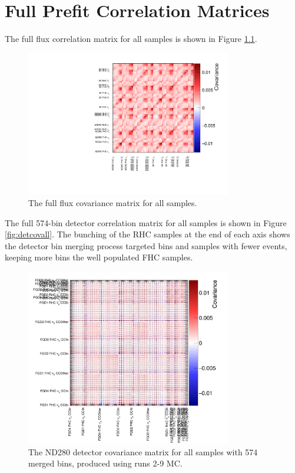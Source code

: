 \chapter{Full Prefit Correlation Matrices}\label{app:matrices}

The full flux correlation matrix for all samples is shown in Figure \ref{fig:fluxcov}.

\begin{figure}[!htbp]
\centering
\includegraphics*[width=0.8\textwidth,clip]{figs/fluxcov}
\caption{The full flux covariance matrix for all samples.}\label{fig:fluxcov}
\end{figure}

The full 574-bin detector correlation matrix for all samples is shown in Figure \ref{fig:detcovall}. The bunching of the RHC samples at the end of each axis shows the detector bin merging process targeted bins and samples with fewer events, keeping more bins the well populated FHC samples.

\begin{figure}[!htbp]
\centering
\includegraphics*[width=0.8\textwidth,clip]{figs/detcov574}
\caption{The ND280 detector covariance matrix for all samples with 574 merged bins, produced using runs 2-9 MC.}\label{fig:detcorr574All}
\end{figure}

